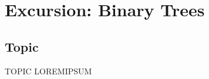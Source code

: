 
\newcommand{\laClass}       {CS 211}
\newcommand{\laSemester}    {Spring 2018}
\newcommand{\laChapter}     {7.6}
\newcommand{\laType}        {Exercise}
\newcommand{\laPoints}      {5}
\newcommand{\laTitle}       {Excursion: Binary Trees}
\newcommand{\laDate}        {}
\setcounter{chapter}{7}
\setcounter{section}{6}
\addtocounter{section}{-1}

\toggletrue{answerkey}
\togglefalse{answerkey}





    \section{\laTitle}

    \subsection{Topic}

    \begin{intro}{TOPIC}
        LOREMIPSUM
    \end{intro}

    \begin{questionNOGRADE}{\thequestion}
        
    \end{questionNOGRADE}


